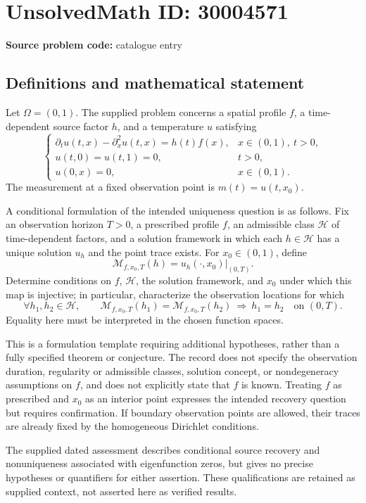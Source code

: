 \documentclass[11pt]{article}
\begin{document}
\section*{UnsolvedMath ID: 30004571}
\textbf{Source problem code:} catalogue entry
\subsection{Definitions and mathematical statement}
Let \(\Omega=(0,1)\). The supplied problem concerns a spatial profile \(f\), a time-dependent source factor \(h\), and a temperature \(u\) satisfying
\[
\begin{cases}
\partial_t u(t,x)-\partial_x^2u(t,x)=h(t)f(x), & x\in(0,1),\ t>0,\\
u(t,0)=u(t,1)=0, & t>0,\\
u(0,x)=0, & x\in(0,1).
\end{cases}
\]
The measurement at a fixed observation point is \(m(t)=u(t,x_0)\).

A conditional formulation of the intended uniqueness question is as follows. Fix an observation horizon \(T>0\), a prescribed profile \(f\), an admissible class \(\mathcal H\) of time-dependent factors, and a solution framework in which each \(h\in\mathcal H\) has a unique solution \(u_h\) and the point trace exists. For \(x_0\in(0,1)\), define
\[
\mathcal M_{f,x_0,T}(h)=u_h(\cdot,x_0)\big|_{(0,T)}.
\]
Determine conditions on \(f\), \(\mathcal H\), the solution framework, and \(x_0\) under which this map is injective; in particular, characterize the observation locations for which
\[
\forall h_1,h_2\in\mathcal H,\qquad
\mathcal M_{f,x_0,T}(h_1)=\mathcal M_{f,x_0,T}(h_2)
\ \Longrightarrow\ h_1=h_2\quad\text{on }(0,T).
\]
Equality here must be interpreted in the chosen function spaces.

This is a formulation template requiring additional hypotheses, rather than a fully specified theorem or conjecture. The record does not specify the observation duration, regularity or admissible classes, solution concept, or nondegeneracy assumptions on \(f\), and does not explicitly state that \(f\) is known. Treating \(f\) as prescribed and \(x_0\) as an interior point expresses the intended recovery question but requires confirmation. If boundary observation points are allowed, their traces are already fixed by the homogeneous Dirichlet conditions.

The supplied dated assessment describes conditional source recovery and nonuniqueness associated with eigenfunction zeros, but gives no precise hypotheses or quantifiers for either assertion. These qualifications are retained as supplied context, not asserted here as verified results.
\end{document}

